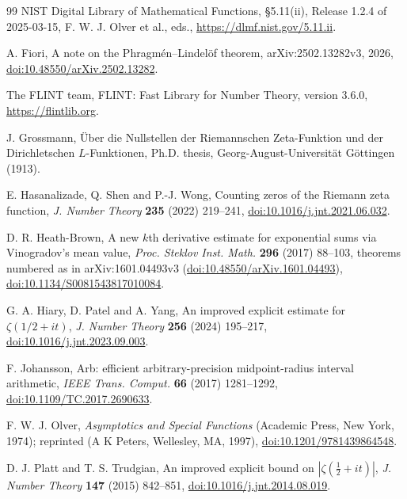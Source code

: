 \documentclass[11pt,reqno]{amsart}
\numberwithin{equation}{section}
\theoremstyle{definition}
\theoremstyle{remark}
\begin{document}
\begin{thebibliography}{99}
 NIST Digital Library of Mathematical Functions, \S5.11(ii), Release 1.2.4 of 2025-03-15, F. W. J. Olver et al., eds., \url{https://dlmf.nist.gov/5.11.ii}.

 A. Fiori, A note on the Phragm\'en--Lindel\"of theorem, arXiv:2502.13282v3, 2026, \href{https://doi.org/10.48550/arXiv.2502.13282}{doi:10.48550/arXiv.2502.13282}.

 The FLINT team, FLINT: Fast Library for Number Theory, version 3.6.0, \url{https://flintlib.org}.

 J. Grossmann, \"Uber die Nullstellen der Riemannschen Zeta-Funktion und der Dirichletschen $L$-Funktionen, Ph.D. thesis, Georg-August-Universit\"at G\"ottingen (1913).

 E. Hasanalizade, Q. Shen and P.-J. Wong, Counting zeros of the Riemann zeta function, \textit{J. Number Theory} \textbf{235} (2022) 219--241, \href{https://doi.org/10.1016/j.jnt.2021.06.032}{doi:10.1016/j.jnt.2021.06.032}.

 D. R. Heath-Brown, A new $k$th derivative estimate for exponential sums via Vinogradov's mean value, \textit{Proc. Steklov Inst. Math.} \textbf{296} (2017) 88--103, theorems numbered as in arXiv:1601.04493v3 (\href{https://doi.org/10.48550/arXiv.1601.04493}{doi:10.48550/arXiv.1601.04493}), \href{https://doi.org/10.1134/S0081543817010084}{doi:10.1134/S0081543817010084}.

 G. A. Hiary, D. Patel and A. Yang, An improved explicit estimate for $\zeta(1/2+it)$, \textit{J. Number Theory} \textbf{256} (2024) 195--217, \href{https://doi.org/10.1016/j.jnt.2023.09.003}{doi:10.1016/j.jnt.2023.09.003}.

 F. Johansson, Arb: efficient arbitrary-precision midpoint-radius interval arithmetic, \textit{IEEE Trans. Comput.} \textbf{66} (2017) 1281--1292, \href{https://doi.org/10.1109/TC.2017.2690633}{doi:10.1109/TC.2017.2690633}.

 F. W. J. Olver, \textit{Asymptotics and Special Functions} (Academic Press, New York, 1974); reprinted (A K Peters, Wellesley, MA, 1997), \href{https://doi.org/10.1201/9781439864548}{doi:10.1201/9781439864548}.

 D. J. Platt and T. S. Trudgian, An improved explicit bound on $|\zeta(\frac12+it)|$, \textit{J. Number Theory} \textbf{147} (2015) 842--851, \href{https://doi.org/10.1016/j.jnt.2014.08.019}{doi:10.1016/j.jnt.2014.08.019}.


\end{thebibliography}
\end{document}
